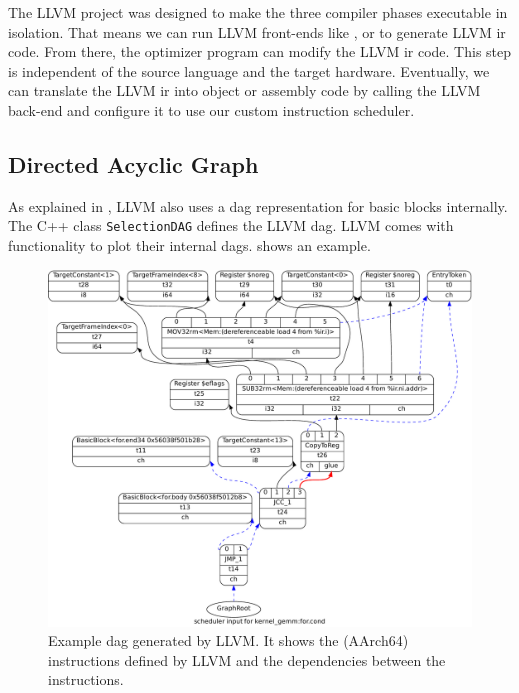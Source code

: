 The LLVM project was designed to make the three compiler phases executable in isolation.
That means we can run LLVM front-ends like , or  to generate LLVM \ac{ir} code.
From there, the optimizer program  can modify the LLVM \ac{ir} code.
This step is independent of the source language and the target hardware.
Eventually, we can translate the LLVM \ac{ir} into object or assembly code by calling the LLVM back-end  and configure it to use our custom instruction scheduler.

\subsection{Directed Acyclic Graph}
As explained in , LLVM also uses a \ac{dag} representation for basic blocks internally.
The C++ class \lstinline|SelectionDAG| defines the LLVM \ac{dag}.
LLVM comes with functionality to plot their internal \acp{dag}.
 shows an example.
\begin{figure}
    \centering
    \includegraphics[width=\textwidth]{img/example-dag-crop.pdf}
    \caption[Example  generated by LLVM]{Example \ac{dag} generated by LLVM. It shows the (AArch64) instructions defined by LLVM and the dependencies between the instructions.}
    \label{fig:bg:llvm-dag}
\end{figure}


